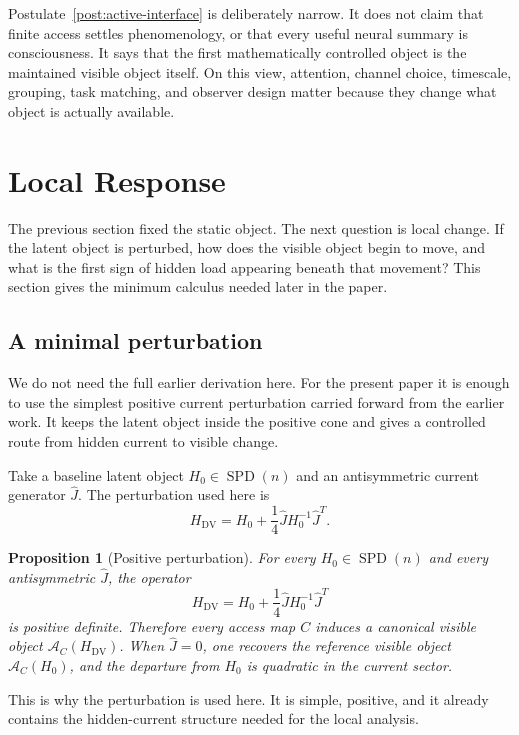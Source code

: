 \documentclass[11pt,a4paper]{article}
\numberwithin{equation}{section}
\DeclareMathOperator{\SPD}{SPD}
\newcommand{\Aobs}{\mathcal A}
\theoremstyle{thmcompact}
\newtheorem{proposition}[theorem]{Proposition}
\theoremstyle{remark}
\begin{document}
Postulate~\ref{post:active-interface} is deliberately narrow. It does not claim that finite access settles phenomenology, or that every useful neural summary is consciousness. It says that the first mathematically controlled object is the maintained visible object itself. On this view, attention, channel choice, timescale, grouping, task matching, and observer design matter because they change what object is actually available.

\section{Local Response}
\label{sec:dv-bridge-local-calculus}

The previous section fixed the static object. The next question is local change. If the latent object is perturbed, how does the visible object begin to move, and what is the first sign of hidden load appearing beneath that movement? This section gives the minimum calculus needed later in the paper.

\subsection{A minimal perturbation}

We do not need the full earlier derivation here. For the present paper it is enough to use the simplest positive current perturbation carried forward from the earlier work. It keeps the latent object inside the positive cone and gives a controlled route from hidden current to visible change.

Take a baseline latent object \(H_0\in\SPD(n)\) and an antisymmetric current generator \(\widehat J\). The perturbation used here is
\[
H_{\mathrm{DV}}=H_0+\frac14\widehat J H_0^{-1}\widehat J^T.
\]

\begin{proposition}[Positive perturbation]
\label{prop:dv-bridge}
For every \(H_0\in\SPD(n)\) and every antisymmetric \(\widehat J\), the operator
\[
H_{\mathrm{DV}}=H_0+\frac14\widehat J H_0^{-1}\widehat J^T
\]
is positive definite. Therefore every access map \(C\) induces a canonical visible object \(\Aobs_C(H_{\mathrm{DV}})\). When \(\widehat J=0\), one recovers the reference visible object \(\Aobs_C(H_0)\), and the departure from \(H_0\) is quadratic in the current sector.
\end{proposition}

This is why the perturbation is used here. It is simple, positive, and it already contains the hidden-current structure needed for the local analysis.
\end{document}
